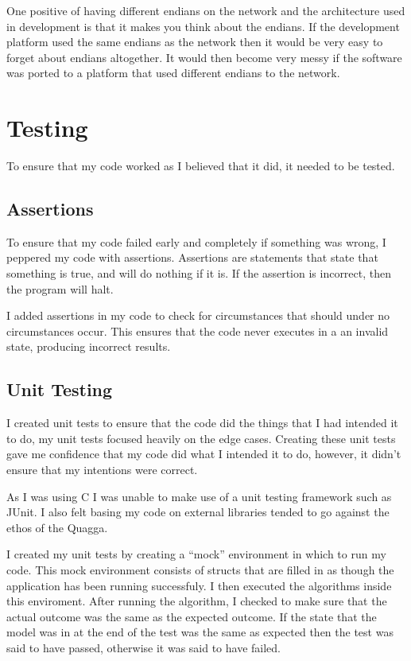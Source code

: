 \documentclass[12pt]{report}
\begin{document}
One positive of having different endians on the network and the architecture used 
in development is that it makes you think about the endians. If the development 
platform used the same endians as the network then it would be very easy to 
forget about endians altogether. It would then become very messy if the software 
was ported to a platform that used different endians to the network.
    
\chapter{Testing}
To ensure that my code worked as I believed that it did, it needed to be tested. 

\section{Assertions}
To ensure that my code failed early and completely if something was wrong, I 
peppered my code with assertions. Assertions are statements that state that 
something is true, and will do nothing if it is. If the assertion is incorrect, 
then the program will halt.

I added assertions in my code to check for circumstances that should under no 
circumstances occur. This ensures that the code never executes in a an invalid 
state, producing incorrect results. 

\section{Unit Testing}
I created unit tests to ensure that the code did the things that I had intended it 
to do, my unit tests focused heavily on the edge cases. Creating these unit tests 
gave me confidence that my code did what I intended it to do, however, it didn't 
ensure that my intentions were correct. 

As I was using C I was unable to make use of a unit testing framework such as
JUnit. I also felt basing my code on external libraries tended to go against
the ethos of the Quagga.

I created my unit tests by creating a ``mock'' environment in which to run my 
code. This mock environment consists of structs that are filled in as though the 
application has been running successfuly.  I then executed the algorithms inside 
this enviroment. After running the algorithm, I checked to make sure that the 
actual outcome was the same as the expected outcome. If the state that the model 
was in at the end of the test was the same as expected then the test was said to 
have passed, otherwise it was said to have failed. 
\end{document}
